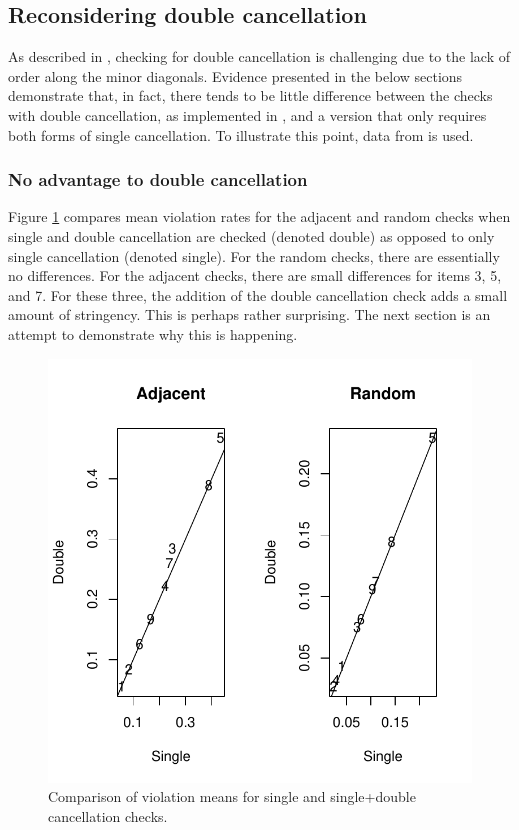 \documentclass[12pt]{article}
\begin{document}
\subsection{Reconsidering double cancellation} \label{sc_dc} 
As described in , checking for double cancellation is challenging due to the lack of order along the minor diagonals. Evidence presented in the below sections demonstrate that, in fact, there tends to be little difference between the checks with double cancellation, as implemented in , and a version that only requires both forms of single cancellation. To illustrate this point, data from  is used.

\subsubsection{No advantage to double cancellation}
Figure \ref{single_example} compares mean violation rates for the adjacent and random checks when single and double cancellation are checked (denoted double) as opposed to only single cancellation (denoted single). For the random checks, there are essentially no differences. For the adjacent checks, there are small differences for items 3, 5, and 7. For these three, the addition of the double cancellation check adds a small amount of stringency. This is perhaps rather surprising. The next section is an attempt to demonstrate why this is happening.


\begin{figure}
\centering
\caption{Comparison of violation means for single and single+double cancellation checks.} \label{single_example}
\includegraphics[width=\textwidth]{./figs/single_example}
\end{figure}
\end{document}
